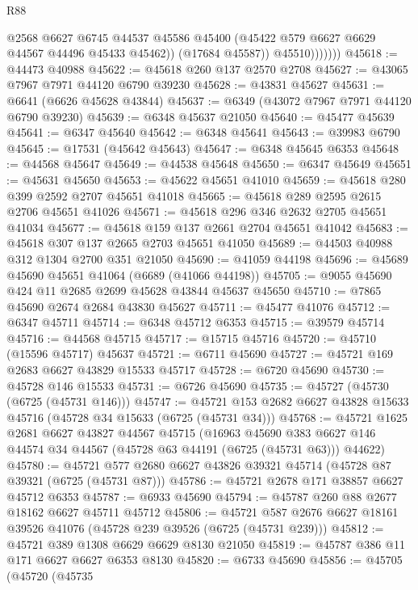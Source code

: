 \begin{lexlean}{R88}
\begin{coremodule}
                      @2568
                      @6627
                      @6745
                      @44537
                      @45586
                      @45400
                      (@45422 @579 @6627 @6629 @44567 @44496 @45433 @45462))
                    (@17684 @45587))
                  @45510)))))))
@45618 := @44473 @40988
@45622 := @45618 @260 @137 @2570 @2708
@45627 := @43065 @7967 @7971 @44120 @6790 @39230
@45628 := @43831 @45627
@45631 := @6641 (@6626 @45628 @43844)
@45637 := @6349 (@43072 @7967 @7971 @44120 @6790 @39230)
@45639 := @6348 @45637 @21050
@45640 := @45477 @45639
@45641 := @6347 @45640
@45642 := @6348 @45641
@45643 := @39983 @6790
@45645 := @17531 (@45642 @45643)
@45647 := @6348 @45645 @6353
@45648 := @44568 @45647
@45649 := @44538 @45648
@45650 := @6347 @45649
@45651 := @45631 @45650
@45653 := @45622 @45651 @41010
@45659 := @45618 @280 @399 @2592 @2707 @45651 @41018
@45665 := @45618 @289 @2595 @2615 @2706 @45651 @41026
@45671 := @45618 @296 @346 @2632 @2705 @45651 @41034
@45677 := @45618 @159 @137 @2661 @2704 @45651 @41042
@45683 := @45618 @307 @137 @2665 @2703 @45651 @41050
@45689 := @44503 @40988 @312 @1304 @2700 @351 @21050
@45690 := @41059 @44198
@45696 := @45689 @45690 @45651 @41064 (@6689 (@41066 @44198))
@45705 := @9055 @45690 @424 @11 @2685 @2699 @45628 @43844 @45637 @45650
@45710 := @7865 @45690 @2674 @2684 @43830 @45627
@45711 := @45477 @41076
@45712 := @6347 @45711
@45714 := @6348 @45712 @6353
@45715 := @39579 @45714
@45716 := @44568 @45715
@45717 := @15715 @45716
@45720 := @45710 (@15596 @45717) @45637
@45721 := @6711 @45690
@45727 := @45721 @169 @2683 @6627 @43829 @15533 @45717
@45728 := @6720 @45690
@45730 := @45728 @146 @15533
@45731 := @6726 @45690
@45735 := @45727 (@45730 (@6725 (@45731 @146)))
@45747 := @45721 @153 @2682 @6627 @43828 @15633 @45716 (@45728 @34 @15633 (@6725 (@45731 @34)))
@45768 := @45721
    @1625
    @2681
    @6627
    @43827
    @44567
    @45715
    (@16963
      @45690
      @383
      @6627
      @146
      @44574
      @34
      @44567
      (@45728 @63 @44191 (@6725 (@45731 @63)))
      @44622)
@45780 := @45721 @577 @2680 @6627 @43826 @39321 @45714 (@45728 @87 @39321 (@6725 (@45731 @87)))
@45786 := @45721 @2678 @171 @38857 @6627 @45712 @6353
@45787 := @6933 @45690
@45794 := @45787 @260 @88 @2677 @18162 @6627 @45711 @45712
@45806 := @45721 @587 @2676 @6627 @18161 @39526 @41076 (@45728 @239 @39526 (@6725 (@45731 @239)))
@45812 := @45721 @389 @1308 @6629 @6629 @8130 @21050
@45819 := @45787 @386 @11 @171 @6627 @6627 @6353 @8130
@45820 := @6733 @45690
@45856 := @45705
    (@45720
      (@45735

\end{coremodule}
\end{lexlean}
